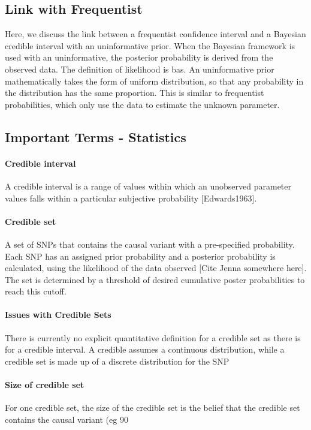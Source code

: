 \subsection{Link with Frequentist}
Here, we discuss the link between a frequentist confidence interval and a Bayesian credible interval with an uninformative prior. When the Bayesian framework is used with an uninformative, the posterior probability is derived from the observed data. The definition of likelihood is bas. An uninformative prior mathematically takes the form of uniform distribution, so that any probability in the distribution has the same proportion. This is similar to frequentist probabilities, which only use the data to estimate the unknown parameter.

\subsection{Important Terms - Statistics}
\paragraph{Credible interval}
A credible interval is a range of values within which an unobserved parameter values falls within a particular subjective probability [Edwards1963]. 

\paragraph{Credible set}
A set of SNPs that contains the causal variant with a pre-specified probability. Each SNP has an assigned prior probability and a posterior probability is calculated, using the likelihood of the data observed [Cite Jenna somewhere here]. The set is determined by a threshold of desired cumulative poster probabilities to reach this cutoff. 

\paragraph{Issues with Credible Sets}
There is currently no explicit quantitative definition for a credible set as there is for a credible interval. A credible assumes a continuous distribution, while a credible set is made up of a discrete distribution for the SNP 

\paragraph{Size of credible set}
For one credible set, the size of the credible set is the belief that the credible set contains the causal variant (eg 90%

